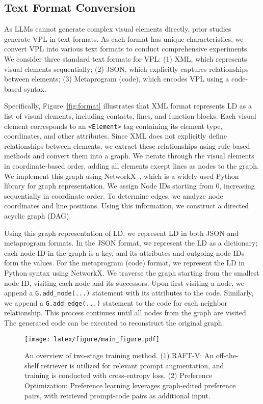 \subsection{Text Format Conversion}\label{sec:conversion}
As LLMs cannot generate complex visual elements directly, prior studies~\cite{xue2024comfybenchbenchmarkingllmbasedagents,zhang2024benchmarking} generate VPL in text formats. As each format has unique characteristics, we convert VPL into various text formats to conduct comprehensive experiments. We consider three standard text formats for VPL: (1) XML, which represents visual elements sequentially; (2) JSON, which explicitly captures relationships between elements; (3) Metaprogram (code), which encodes VPL using a code-based syntax. 

Specifically, Figure~\ref{fig:format} illustrates that XML format represents LD as a list of visual elements, including contacts, lines, and function blocks. Each visual element corresponds to an \texttt{<Element>} tag containing its element type, coordinates, and other attributes. Since XML does not explicitly define relationships between elements, we extract these relationships using rule-based methods and convert them into a graph. We iterate through the visual elements in coordinate-based order, adding all elements except lines as nodes to the graph. We implement this graph using NetworkX~\cite{SciPyProceedings_11}, which is a widely used Python library for graph representation. We assign Node IDs starting from 0, increasing sequentially in coordinate order. To determine edges, we analyze node coordinates and line positions. Using this information, we construct a directed acyclic graph (DAG).
 
Using this graph representation of LD, we represent LD in both JSON and metaprogram formats. In the JSON format, we represent the LD as a dictionary; each node ID in the graph is a key, and its attributes and outgoing node IDs form the values. For the metaprogram (code) format, we represent the LD in Python syntax using NetworkX. We traverse the graph starting from the smallest node ID, visiting each node and its successors. Upon first visiting a node, we append a \texttt{G.add\_node(...)} statement with its attributes to the code. Similarly, we append a \texttt{G.add\_edge(...)} statement to the code for each neighbor relationship. This process continues until all nodes from the graph are visited. The generated code can be executed to reconstruct the original graph.

\begin{figure*}[!htb]
    \centering
    \texttt{[image: latex/figure/main\_figure.pdf]}
    \caption{An overview of two-stage training method. (1) RAFT-V: An off-the-shelf retriever is utilized for relevant prompt augmentation, and training is conducted with cross-entropy loss. (2) Preference Optimization: Preference learning leverages graph-edited preference pairs, with retrieved prompt-code pairs as additional input.}
    \label{fig:main_figure}
\end{figure*}

